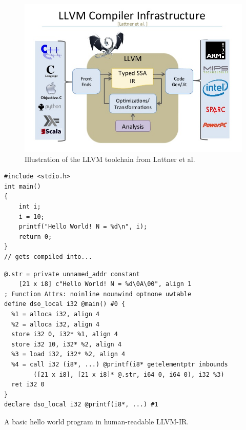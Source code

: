 \begin{figure}
    \centering
    \includegraphics[width=.8\textwidth]{img/llvm.png}
    \caption{Illustration of the LLVM toolchain from Lattner et al.}
    \label{fig:llvm}
\end{figure}

\begin{listing}
    \begin{verbatim}
#include <stdio.h>
int main()
{
    int i;
    i = 10;
    printf("Hello World! N = %d\n", i);
    return 0;
}
// gets compiled into...
    \end{verbatim}
    \begin{verbatim}
@.str = private unnamed_addr constant 
    [21 x i8] c"Hello World! N = %d\0A\00", align 1
; Function Attrs: noinline nounwind optnone uwtable
define dso_local i32 @main() #0 {
  %1 = alloca i32, align 4
  %2 = alloca i32, align 4
  store i32 0, i32* %1, align 4
  store i32 10, i32* %2, align 4
  %3 = load i32, i32* %2, align 4
  %4 = call i32 (i8*, ...) @printf(i8* getelementptr inbounds 
        ([21 x i8], [21 x i8]* @.str, i64 0, i64 0), i32 %3)
  ret i32 0
}
declare dso_local i32 @printf(i8*, ...) #1
    \end{verbatim}
    \caption{A basic hello world program in human-readable LLVM-IR.}
    \label{lst:llvmir}
\end{listing}

